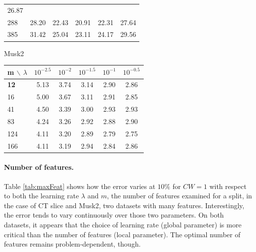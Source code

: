 \documentclass{article}
\begin{document}
\begin{table}[t]
\begin{center}
\begin{small}
\begin{tabular}{l|ccccc}
\cellcolor[gray]{0.61} 26.87 \\
288 & \cellcolor[gray]{0.55} 28.20 & \cellcolor[gray]{0.82} 22.43 & 
\cellcolor[gray]{0.89} 20.91 & \cellcolor[gray]{0.83} 22.31 & 
\cellcolor[gray]{0.58} 27.64 \\
385 & \cellcolor[gray]{0.40} 31.42 & \cellcolor[gray]{0.70} 25.04 & 
\cellcolor[gray]{0.79} 23.11 & \cellcolor[gray]{0.74} 24.17 & 
\cellcolor[gray]{0.49} 29.56 \\
\hline
\end{tabular}
\par
Musk2\\
\begin{tabular}{l|ccccc}
\hline
m $\backslash$ $\lambda$  &  $10^{-2.5}$ & $10^{-2}$ & $10^{-1.5}$ & 
$10^{-1}$ & $10^{-0.5}$ \\
\hline
{\bf 12} & \cellcolor[gray]{0.40} 5.13 & \cellcolor[gray]{0.75} 3.74 & 
\cellcolor[gray]{0.90} 3.14 & \cellcolor[gray]{0.96} 2.90 & 
\cellcolor[gray]{0.97} 2.86 \\
16 & \cellcolor[gray]{0.43} 5.00 & \cellcolor[gray]{0.77} 3.67 & 
\cellcolor[gray]{0.91} 3.11 & \cellcolor[gray]{0.96} 2.91 & 
\cellcolor[gray]{0.97} 2.85 \\
41 & \cellcolor[gray]{0.56} 4.50 & \cellcolor[gray]{0.84} 3.39 & 
\cellcolor[gray]{0.94} 3.00 & \cellcolor[gray]{0.95} 2.93 & 
\cellcolor[gray]{0.96} 2.93 \\
83 & \cellcolor[gray]{0.62} 4.24 & \cellcolor[gray]{0.87} 3.26 & 
\cellcolor[gray]{0.96} 2.92 & \cellcolor[gray]{0.97} 2.88 & 
\cellcolor[gray]{0.96} 2.90 \\
124 & \cellcolor[gray]{0.66} 4.11 & \cellcolor[gray]{0.89} 3.20 & 
\cellcolor[gray]{0.96} 2.89 & \cellcolor[gray]{0.99} 2.79 & 
\cellcolor[gray]{1.00} 2.75 \\
166 & \cellcolor[gray]{0.66} 4.11 & \cellcolor[gray]{0.89} 3.19 & 
\cellcolor[gray]{0.95} 2.94 & \cellcolor[gray]{0.98} 2.84 & 
\cellcolor[gray]{0.97} 2.86 \\
\hline
\end{tabular}
\end{small}
\end{center}
\vskip -0.1in
\end{table}

\paragraph{Number of features.}
Table \ref{tab:maxFeat} shows how the error varies at $10\%$ for $CW=1$ with 
respect to both the learning rate $\lambda$ and $m$, the number of features 
examined for a split, in the case of CT slice and Musk2, two datasets with many 
features.
Interestingly, the error tends to vary continuously over those two parameters. 
On both datasets, it appears that the choice of learning rate (global 
parameter) is more critical than the number of features (local parameter). The 
optimal number of features remains problem-dependent, though. 
\end{document}
